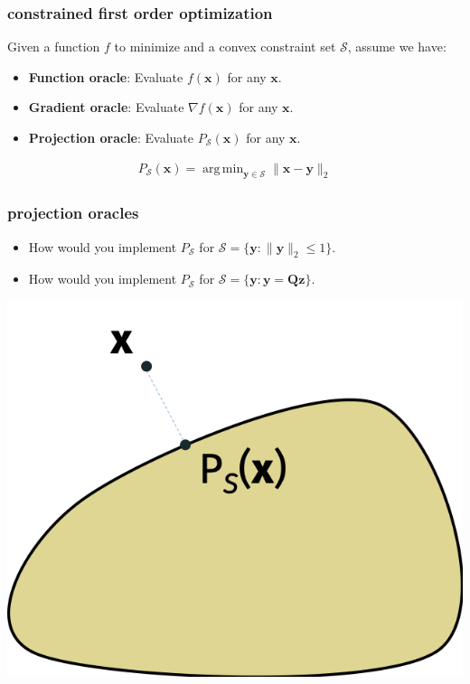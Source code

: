 \documentclass[compress]{beamer}
\newcommand{\bv}[1]{\mathbf{#1}}
\DeclareMathOperator*{\argmin}{arg\,min}
\begin{document}
\begin{frame}
	\frametitle{constrained first order optimization}
	Given a function $f$ to minimize and a convex constraint set $\mathcal{S}$, assume we have:
	\begin{itemize}
		\item \textbf{Function oracle}: Evaluate $f(\bv{x})$ for any $\bv{x}$. 
		\item \textbf{Gradient oracle}: Evaluate $\nabla f(\bv{x})$ for any $\bv{x}$.
		\item \textbf{\alert{Projection oracle}}: Evaluate $P_{\mathcal{S}}(\bv{x})$ for any $\bv{x}$.
	\end{itemize}
\begin{align*}
	P_{\mathcal{S}}(\bv{x}) = \argmin_{\bv{y}\in \mathcal{S}} \|\bv{x} - \bv{y}\|_2
\end{align*}
\end{frame}

\begin{frame}
	\frametitle{projection oracles}
	\begin{itemize}
		\item How would you implement $P_\mathcal{S}$ for $\mathcal{S} = \{\bv{y}:\|\bv{y}\|_2\leq 1\}.$
		\item How would you implement $P_\mathcal{S}$ for $\mathcal{S} = \{\bv{y}:\bv{y} = \bv{Q}\bv{z}\}.$
	\end{itemize}
\begin{center}
	\includegraphics[width=.5\textwidth]{projection_image.png}
\end{center}
\end{frame}
\end{document}

